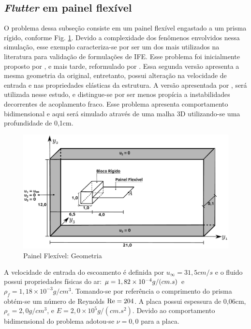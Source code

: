 \documentclass[tese_patricia]{subfiles}
\begin{document}
\subsection{\textit{Flutter} em painel flexível}

O problema dessa subseção consiste em um painel flexível engastado a um prisma rígido, conforme Fig. \ref{fig:Painel:Geometria}. Devido a complexidade dos fenômenos envolvidos nessa simulação, esse exemplo caracteriza-se por ser um dos mais utilizados na literatura para validação de formulações de IFE. Esse problema foi inicialmente proposto por , e mais tarde, reformulado por . Essa segunda versão apresenta a mesma geometria da original, entretanto, possui alteração na velocidade de entrada e nas propriedades elásticas da estrutura. A versão apresentada por , será utilizada nesse estudo, e distingue-se por ser menos propícia a instabilidades decorrentes de acoplamento fraco. Esse problema apresenta comportamento bidimensional e aqui será simulado através de uma malha 3D utilizando-se uma profundidade de 0,1cm.

\begin{figure}[htb!]
	\centering 
	\includegraphics[scale=0.5,trim=0cm 0cm 0cm 0cm, clip=true]{Imagens/Cap7/prismaGeo.pdf}	
	\caption{Painel Flexível: Geometria}
	\label{fig:Painel:Geometria}
\end{figure}

A velocidade de entrada do escoamento é definida por $u_{\infty} = 31,5 cm/s$ e o fluido possui propriedades físicas do ar: $\mu=1,82\times10^{-4} g/(cm.s)$ e $\rho_{f} = 1,18\times10^{-3} g/cm^3 $. Tomando-se por referência o comprimento do prisma obtém-se um número de Reynolds $\mathrm{Re} = 204$. A placa possui espessura de 0,06cm, $\rho_{e} =  2,0 g/cm^3 $, e $E = 2,0\times10^{5} g/(cm.s^2)$. Devido ao comportamento bidimensional do problema adotou-se $\nu=0,0$ para a placa. 
\end{document}
